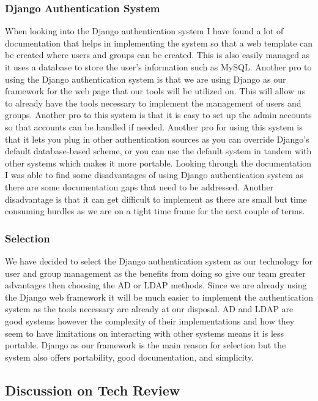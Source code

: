 \documentclass[draftclsnofoot,10pt,onecolumn]{IEEEtran} %
\begin{document}
\subsubsection{Django Authentication System}
When looking into the Django authentication system I have found a lot of documentation that helps in implementing the
system so that a web template can be created where users and groups can be created. This is also easily managed as it uses a
database to store the user’s information such as MySQL. Another pro to using the Django authentication system is that we
are using Django as our framework for the web page that our tools will be utilized on. This will allow us to already have the
tools necessary to implement the management of users and groups. Another pro to this system is that it is easy to set up the
admin accounts so that accounts can be handled if needed. Another pro for using this system is that it lets you plug in other
authentication sources as you can override Django’s default database-based scheme, or you can use the default system in
tandem with other systems which makes it more portable. Looking through the documentation I was able to find some
disadvantages of using Django authentication system as there are some documentation gaps that need to be addressed.
Another disadvantage is that it can get difficult to implement as there are small but time consuming hurdles as we are on a
tight time frame for the next couple of terms. \\

\subsubsection{Selection}
We have decided to select the Django authentication system as our technology for user and group management as the benefits
from doing so give our team greater advantages then choosing the AD or LDAP methods. Since we are already using the
Django web framework it will be much easier to implement the authentication system as the tools necessary are already at
our disposal. AD and LDAP are good systems however the complexity of their implementations and how they seem to have
limitations on interacting with other systems means it is less portable. Django as our framework is the main reason for
selection but the system also offers portability, good documentation, and simplicity. 

\subsection{Discussion on Tech Review}
\end{document}
